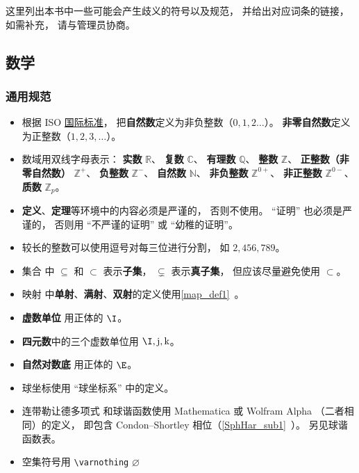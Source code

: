
这里列出本书中一些可能会产生歧义的符号以及规范， 并给出对应词条的链接， 如需补充， 请与管理员协商。

\subsection{数学}
\subsubsection{通用规范}
\begin{itemize}
\item 根据 ISO \href{https://en.wikipedia.org/wiki/ISO/IEC_80000}{国际标准}， 把\textbf{自然数}定义为非负整数（$0,1,2\dots$）。 \textbf{非零自然数}定义为正整数（$1,2,3,\dots$）。
\item 数域用双线字母表示： \textbf{实数} $\mathbb R$、 \textbf{复数} $\mathbb C$、 \textbf{有理数} $\mathbb Q$、 \textbf{整数} $\mathbb Z$、 \textbf{正整数（非零自然数）} $\mathbb Z^+$、 \textbf{负整数} $\mathbb Z^-$、 \textbf{自然数} $\mathbb N$、 \textbf{非负整数} $\mathbb Z^{0+}$、 \textbf{非正整数} $\mathbb Z^{0-}$、 \textbf{质数} $\mathbb Z_p$。
\item \textbf{定义}、\textbf{定理}等环境中的内容必须是严谨的， 否则不使用。 “证明” 也必须是严谨的， 否则用 “不严谨的证明” 或 “幼稚的证明”。
\item 较长的整数可以使用逗号对每三位进行分割， 如 $2,456,789$。
\item 集合 中 $\subseteq$ 和 $\subset$ 表示\textbf{子集}， $\subsetneq$ 表示\textbf{真子集}， 但应该尽量避免使用 $\subset$。
\item 映射 中\textbf{单射}、\textbf{满射}、\textbf{双射}的定义使用\autoref{map_def1}~。
\item \textbf{虚数单位} 用正体的 $\I$。
\item \textbf{四元数}中的三个虚数单位用 $\I, \mathrm{j}, \mathrm{k}$。
\item \textbf{自然对数底} 用正体的 $\E$。
\item 球坐标使用 “球坐标系” 中的定义。
\item 连带勒让德多项式 和球谐函数使用 Mathematica 或 Wolfram Alpha （二者相同）的定义， 即包含 Condon–Shortley 相位（\autoref{SphHar_sub1}~）。 另见球谐函数表。
\item 空集符号用 \verb|\varnothing| $\varnothing$
\end{itemize}

